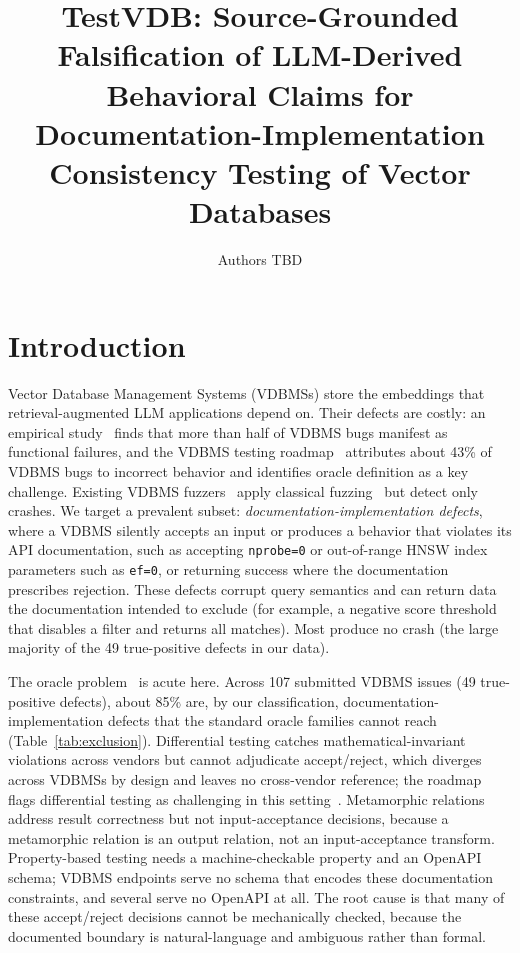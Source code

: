 \documentclass[sigconf]{acmart}
\title[TestVDB: source-grounded falsification for VDBMS API documentation-implementation consistency]{TestVDB: Source-Grounded Falsification of LLM-Derived Behavioral Claims for Documentation-Implementation Consistency Testing of Vector Databases}
\author{Authors TBD}
\affiliation{\institution{TBD (anonymity depends on venue)}\country{TBD}}
\begin{document}
\maketitle

\section{Introduction}

Vector Database Management Systems (VDBMSs) store the embeddings that retrieval-augmented LLM applications depend on. Their defects are costly: an empirical study~\cite{bugstudy25} finds that more than half of VDBMS bugs manifest as functional failures, and the VDBMS testing roadmap~\cite{roadmap25} attributes about 43\% of VDBMS bugs to incorrect behavior and identifies oracle definition as a key challenge. Existing VDBMS fuzzers~\cite{vdbfuzz26} apply classical fuzzing~\cite{manes21} but detect only crashes. We target a prevalent subset: \emph{documentation-implementation defects}, where a VDBMS silently accepts an input or produces a behavior that violates its API documentation, such as accepting \texttt{nprobe=0} or out-of-range HNSW index parameters such as \texttt{ef=0}, or returning success where the documentation prescribes rejection. These defects corrupt query semantics and can return data the documentation intended to exclude (for example, a negative score threshold that disables a filter and returns all matches). Most produce no crash (the large majority of the 49 true-positive defects in our data).

The oracle problem~\cite{barr15} is acute here. Across 107 submitted VDBMS issues (49 true-positive defects), about 85\% are, by our classification, documentation-implementation defects that the standard oracle families cannot reach (Table~\ref{tab:exclusion}). Differential testing catches mathematical-invariant violations across vendors but cannot adjudicate accept/reject, which diverges across VDBMSs by design and leaves no cross-vendor reference; the roadmap flags differential testing as challenging in this setting~\cite{roadmap25}. Metamorphic relations~\cite{metmap24} address result correctness but not input-acceptance decisions, because a metamorphic relation is an output relation, not an input-acceptance transform. Property-based testing needs a machine-checkable property and an OpenAPI schema; VDBMS endpoints serve no schema that encodes these documentation constraints, and several serve no OpenAPI at all. The root cause is that many of these accept/reject decisions cannot be mechanically checked, because the documented boundary is natural-language and ambiguous rather than formal.
\end{document}
